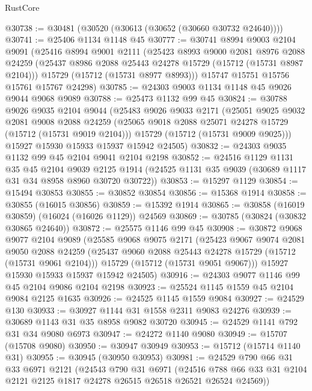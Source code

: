 \begin{lexlean}{RustCore}
\begin{coremodule}
@30738 := @30481 (@30520 (@30613 (@30652 (@30660 @30732 @24640))))
@30741 := @25406 @1134 @1148 @45
@30777 := @30741
    @8994
    @9003
    @2104
    @9091
    (@25416
      @8994
      @9001
      @2111
      (@25423
        @8993
        @9000
        @2081
        @8976
        @2088
        @24259
        (@25437 @8986 @2088 @25443 @24278 @15729 (@15712 (@15731 @8987 @2104)))
        @15729
        (@15712 (@15731 @8977 @8993)))
      @15747
      @15751
      @15756
      @15761
      @15767
      @24298)
@30785 := @24303 @9003 @1134 @1148 @45 @9026 @9044 @9068 @9089
@30788 := @25473 @1132 @99 @45
@30824 := @30788
    @9026
    @9035
    @2104
    @9044
    (@25483
      @9026
      @9033
      @2171
      (@25051
        @9025
        @9032
        @2081
        @9008
        @2088
        @24259
        (@25065 @9018 @2088 @25071 @24278 @15729 (@15712 (@15731 @9019 @2104)))
        @15729
        (@15712 (@15731 @9009 @9025)))
      @15927
      @15930
      @15933
      @15937
      @15942
      @24505)
@30832 := @24303 @9035 @1132 @99 @45 @2104 @9041 @2104 @2198
@30852 := @24516
    @1129
    @1131
    @35
    @45
    @2104
    @9039
    @2125
    @1914
    (@24525 @1131 @35 @9039 (@30689 @1117 @31 @34 @8958 @8960 @30720 @30722))
@30853 := @15297 @1129
@30854 := @15494 @30853
@30855 := @30852 @30854
@30856 := @15368 @1914
@30858 := @30855 (@16015 @30856)
@30859 := @15392 @1914
@30865 := @30858 (@16019 @30859) (@16024 (@16026 @1129)) @24569
@30869 := @30785 (@30824 (@30832 @30865 @24640))
@30872 := @25575 @1146 @99 @45
@30908 := @30872
    @9068
    @9077
    @2104
    @9089
    (@25585
      @9068
      @9075
      @2171
      (@25423
        @9067
        @9074
        @2081
        @9050
        @2088
        @24259
        (@25437 @9060 @2088 @25443 @24278 @15729 (@15712 (@15731 @9061 @2104)))
        @15729
        (@15712 (@15731 @9051 @9067)))
      @15927
      @15930
      @15933
      @15937
      @15942
      @24505)
@30916 := @24303 @9077 @1146 @99 @45 @2104 @9086 @2104 @2198
@30923 := @25524 @1145 @1559 @45 @2104 @9084 @2125 @1635
@30926 := @24525 @1145 @1559 @9084
@30927 := @24529 @130
@30933 := @30927 @1144 @31 @1558 @2311 @9083 @24276
@30939 := @30689 @1143 @31 @35 @8958 @9082 @30720
@30945 := @24529 @1141 @792 @31 @34 @9080 @6973
@30947 := @24272 @1140 @9080
@30949 := @15707 (@15708 @9080)
@30950 := @30947 @30949
@30953 := @15712 (@15714 @1140 @31)
@30955 := @30945 (@30950 @30953)
@30981 := @24529
    @790
    @66
    @31
    @33
    @6971
    @2121
    (@24543
      @790
      @31
      @6971
      (@24516 @788 @66 @33 @31 @2104 @2121 @2125 @1817 @24278 @26515 @26518 @26521 @26524 @24569))

\end{coremodule}
\end{lexlean}
